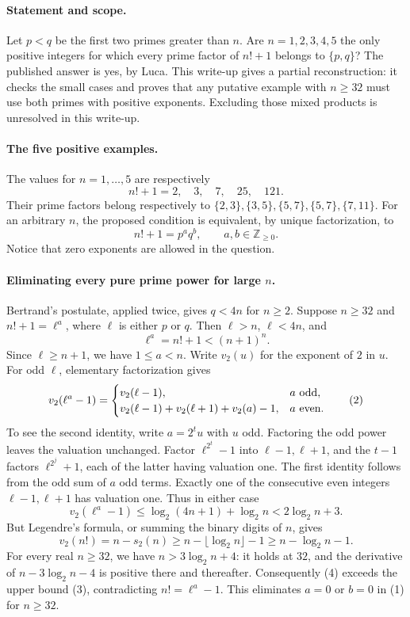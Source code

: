 \paragraph{Statement and scope.}
Let \(p<q\) be the first two primes greater than \(n\). Are \(n=1,2,3,4,5\) the only positive integers for which every prime factor of \(n!+1\) belongs to \(\{p,q\}\)?
The published answer is yes, by Luca. This write-up gives a partial reconstruction: it checks the small cases and proves that any putative example with \(n\geq32\) must use both primes with positive exponents. Excluding those mixed products is unresolved in this write-up.

\paragraph{The five positive examples.}
The values for \(n=1,\ldots,5\) are respectively
\[
 n!+1=2,\quad3,\quad7,\quad25,\quad121.
\]
Their prime factors belong respectively to
\(\{2,3\},\{3,5\},\{5,7\},\{5,7\},\{7,11\}\).
For an arbitrary \(n\), the proposed condition is equivalent, by unique factorization, to
\[
 n!+1=p^a q^b,\qquad a,b\in\mathbb Z_{\geq0}.
 \tag{1}
\]
Notice that zero exponents are allowed in the question.

\paragraph{Eliminating every pure prime power for large \(n\).}
Bertrand's postulate, applied twice, gives \(q<4n\) for \(n\geq2\). Suppose \(n\geq32\) and \(n!+1=\ell^a\), where \(\ell\) is either \(p\) or \(q\). Then \(\ell>n\), \(\ell<4n\), and
\[
 \ell^a=n!+1<(n+1)^n.
\]
Since \(\ell\geq n+1\), we have \(1\leq a<n\).
Write \(v_2(u)\) for the exponent of \(2\) in \(u\). For odd \(\ell\), elementary factorization gives
\[
 v_2(\ell^a-1)=
 \begin{cases}
 v_2(\ell-1),&a\ \hbox{odd},\\
 v_2(\ell-1)+v_2(\ell+1)+v_2(a)-1,&a\ \hbox{even}.
 \end{cases}
 \tag{2}
\]
To see the second identity, write \(a=2^t u\) with \(u\) odd. Factoring the odd power leaves the valuation unchanged. Factor \(\ell^{2^t}-1\) into \(\ell-1,\ell+1\), and the \(t-1\) factors \(\ell^{2^j}+1\), each of the latter having valuation one. The first identity follows from the odd sum of \(a\) odd terms.
Exactly one of the consecutive even integers \(\ell-1,\ell+1\) has valuation one. Thus in either case
\[
 v_2(\ell^a-1)
 \leq\log_2(4n+1)+\log_2 n
 <2\log_2 n+3.
 \tag{3}
\]
But Legendre's formula, or summing the binary digits of \(n\), gives
\[
 v_2(n!)=n-s_2(n)\geq n-\lfloor\log_2 n\rfloor-1
 \geq n-\log_2 n-1.
 \tag{4}
\]
For every real \(n\geq32\), we have \(n>3\log_2n+4\): it holds at \(32\), and the derivative of \(n-3\log_2n-4\) is positive there and thereafter. Consequently (4) exceeds the upper bound (3), contradicting \(n!=\ell^a-1\). This eliminates \(a=0\) or \(b=0\) in (1) for \(n\geq32\).

